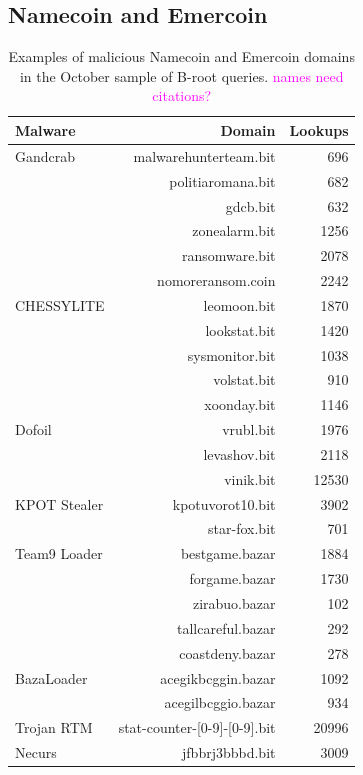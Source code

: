 \documentclass[conference]{IEEEtran}
\newcommand{\randall}{\ding{110}\ding{43}\textcolor{magenta}}
\newcommand{\randall}{}
\begin{document}
\subsection{Namecoin and Emercoin}
\begin{table}
	\begin{tabular}{lrr}
		\toprule
		Malware & Domain & Lookups \\
		\midrule
		Gandcrab	&	malwarehunterteam.bit	&	696	\\
			&	politiaromana.bit	&	682	\\
			&	gdcb.bit	&	632	\\
			&	zonealarm.bit	&	1256	\\
			&	ransomware.bit	&	2078	\\
			&	nomoreransom.coin	&	2242	\\
		CHESSYLITE	&	leomoon.bit	&	1870	\\
			&	lookstat.bit	&	1420	\\
			&	sysmonitor.bit	&	1038	\\
			&	volstat.bit	&	910	\\
			&	xoonday.bit	&	1146	\\
		Dofoil	&	vrubl.bit	&	1976	\\
			&	levashov.bit	&	2118	\\
			&	vinik.bit	&	12530	\\
		KPOT Stealer	&	kpotuvorot10.bit	&	3902	\\
			&	star-fox.bit	&	701	\\
		Team9 Loader	&	bestgame.bazar	&	1884	\\
			&	forgame.bazar	&	1730	\\
			&	zirabuo.bazar	&	102	\\
			&	tallcareful.bazar	&	292	\\
			&	coastdeny.bazar	&	278	\\
		BazaLoader	&	acegikbcggin.bazar	&	1092	\\
			&	acegilbcggio.bazar	&	934	\\
		Trojan RTM	&	stat-counter-[0-9]-[0-9].bit	&	20996	\\
		Necurs	&	jfbbrj3bbbd.bit	&	3009	\\
		\bottomrule
	\end{tabular}
	\caption{Examples of malicious Namecoin and Emercoin domains in the October sample of B-root 
	queries. \randall{names need citations?}}
	\label{tab:namecoin_emercoin}
\end{table}

%
\end{document}
